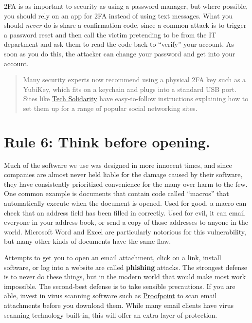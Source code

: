 \documentclass[10pt,letterpaper]{article}
\begin{document}
2FA is as important to security as using a password manager, but where possible,
you should rely on an app for 2FA instead of using text messages. What you
should \emph{never} do is share a confirmation code, since a common attack is to
trigger a password reset and then call the victim pretending to be from the IT
department and ask them to read the code back to ``verify'' your account. As
soon as you do this, the attacker can change your password and get into your
account.

\begin{quote}
  Many security experts now recommend using a physical 2FA key such as a
  YubiKey, which fits on a keychain and plugs into a standard USB port.  Sites
  like \href{https://techsolidarity.org/}{Tech Solidarity} have easy-to-follow
  instructions explaining how to set them up for a range of popular social
  networking sites.
\end{quote}

\section*{Rule 6: Think before opening.}

Much of the software we use was designed in more innocent times, and since
companies are almost never held liable for the damage caused by their software,
they have consistently prioritized convenience for the many over harm to the
few. One common example is documents that contain code called ``macros'' that
automatically execute when the document is opened. Used for good, a macro can
check that an address field has been filled in correctly. Used for evil, it can
email everyone in your address book, or send a copy of those addresses to anyone
in the world.  Microsoft Word and Excel are particularly notorious for this
vulnerability, but many other kinds of documents have the same flaw.

Attempts to get you to open an email attachment, click on a link, install
software, or log into a website are called \textbf{phishing} attacks. The
strongest defense is to never do these things, but in the modern world that
would make most work impossible. The second-best defense is to take sensible
precautions. If you are able, invest in virus scanning software such as
\href{https://www.proofpoint.com/us/products/email-protection}{Proofpoint}
to scan email attachments before you download them. While many email clients
have virus scanning technology built-in, this will offer an extra layer of
protection.
\end{document}
